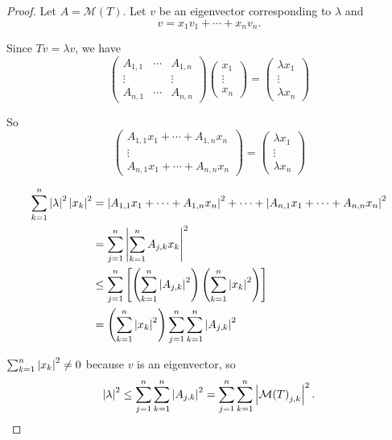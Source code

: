 \begin{proof}
    Let $A = \mathcal{M}(T)$. Let $v$ be an eigenvector corresponding to $\lambda$ and
    \[
        v = x_{1}v_{1} + \cdots + x_{n}v_{n}.
    \]

    Since $Tv = \lambda v$, we have
    \[
        \begin{pmatrix}
            A_{1,1} & \cdots & A_{1,n} \\
            \vdots  &        & \vdots  \\
            A_{n,1} & \cdots & A_{n,n}
        \end{pmatrix}
        \begin{pmatrix}
            x_{1}  \\
            \vdots \\
            x_{n}
        \end{pmatrix}
        =
        \begin{pmatrix}
            \lambda x_{1} \\
            \vdots        \\
            \lambda x_{n}
        \end{pmatrix}
    \]

    So
    \[
        \begin{pmatrix}
            A_{1,1}x_{1} + \cdots + A_{1,n}x_{n} \\
            \vdots                               \\
            A_{n,1}x_{1} + \cdots + A_{n,n}x_{n}
        \end{pmatrix}
        =
        \begin{pmatrix}
            \lambda x_{1} \\
            \vdots        \\
            \lambda x_{n}
        \end{pmatrix}
    \]

    \begin{align*}
        \sum^{n}_{k=1} \left\vert{\lambda}\right\vert^{2}\left\vert{x_{k}}\right\vert^{2} & = \left\vert{A_{1,1}x_{1} + \cdots + A_{1,n}x_{n}}\right\vert^{2} + \cdots + \left\vert{A_{n,1}x_{1} + \cdots + A_{n,n}x_{n}}\right\vert^{2}             \\
                                                        & = \sum^{n}_{j=1}\left\vert{\sum^{n}_{k=1}A_{j,k}x_{k}}\right\vert^{2}                                                                   \\
                                                        & \leq \sum^{n}_{j=1}\left[\left(\sum^{n}_{k=1}\left\vert{A_{j,k}}\right\vert^{2}\right)\left(\sum^{n}_{k=1}\left\vert{x_{k}}\right\vert^{2}\right)\right] \\
                                                        & = \left(\sum^{n}_{k=1}\left\vert{x_{k}}\right\vert^{2}\right)\sum^{n}_{j=1}\sum^{n}_{k=1}\left\vert{A_{j,k}}\right\vert^{2}
    \end{align*}

    $\sum^{n}_{k=1}\left\vert{x_{k}}\right\vert^{2}\ne 0$ because $v$ is an eigenvector, so
    \[
        \left\vert{\lambda}\right\vert^{2}\leq \sum^{n}_{j=1}\sum^{n}_{k=1}\left\vert{A_{j,k}}\right\vert^{2} = \sum^{n}_{j=1}\sum^{n}_{k=1}\left\vert{{\mathcal{M}(T)}_{j,k}}\right\vert^{2}.\qedhere
    \]
\end{proof}
\newpage

